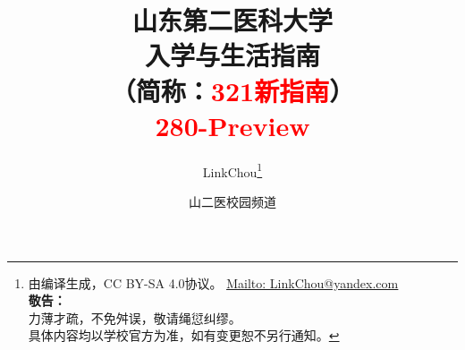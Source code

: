 

\title{%
\normalsize
{\Huge\textbf{山东第二医科大学\\[6pt]入学与生活指南}}\\[6pt]
（简称：\textcolor{red}{321新指南}）\\[25pt]
{\large\textcolor{red}{280-Preview}}\vspace*{-25pt}}
\author{LinkChou\thanks{由\LaTeXe 编译生成，CC BY-SA 4.0协议。%
                \uline{\href{Mailto:LinkChou@yandex.com}{Mailto: LinkChou@yandex.com}}\\%
                \textbf{敬告：}\\%
                \indent\indent 力薄才疏，不免舛误，敬请绳愆纠缪。\\%
                \indent\indent 具体内容均以学校官方为准，如有变更恕不另行通知。}\and 山二医校园频道}
\date{\DTMnow}
\maketitle

\renewcommand{\thefootnote}{\arabic{footnote}}

\tableofcontents